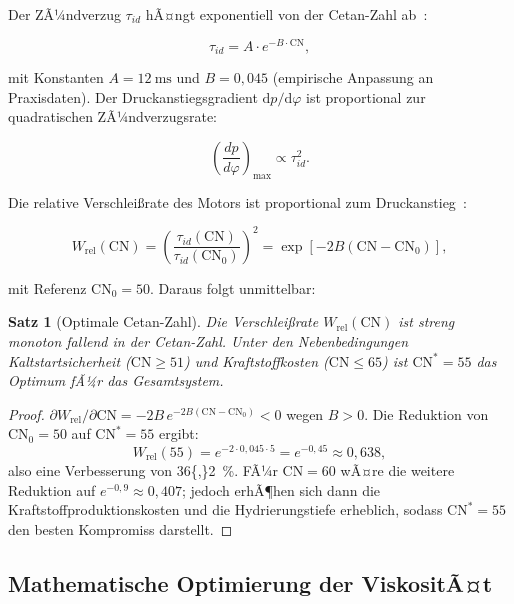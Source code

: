 ﻿\documentclass[12pt,a4paper]{article}
\newtheorem{theorem}{Satz}[section]
\newcommand{\CN}{\ensuremath{\mathrm{CN}}}
\begin{document}
Der ZÃ¼ndverzug $\tau_{id}$ hÃ¤ngt exponentiell von der Cetan-Zahl ab~\cite{heywood1988}:

\begin{equation}
  \tau_{id} = A \cdot e^{-B \cdot \CN},
  \label{eq:zuendverzug}
\end{equation}

mit Konstanten $A = \SI{12}{\ms}$ und $B = 0{,}045$ (empirische Anpassung
an Praxisdaten). Der Druckanstiegsgradient $\mathrm{d}p/\mathrm{d}\varphi$
ist proportional zur quadratischen ZÃ¼ndverzugsrate:

\begin{equation}
  \left(\frac{dp}{d\varphi}\right)_{\max} \propto \tau_{id}^2.
  \label{eq:druckanstieg}
\end{equation}

Die relative Verschlei\ss{}rate des Motors ist proportional zum
Druckanstieg~\cite{stanglmaier1999}:

\begin{equation}
  W_{\mathrm{rel}}(\CN) = \left(\frac{\tau_{id}(\CN)}{\tau_{id}(\CN_0)}\right)^2
  = \exp\!\left[-2B(\CN - \CN_0)\right],
  \label{eq:verschleiss_CN}
\end{equation}

mit Referenz $\CN_0 = 50$. Daraus folgt unmittelbar:

\begin{theorem}[Optimale Cetan-Zahl]
\label{thm:cetan}
Die Verschlei\ss{}rate $W_{\mathrm{rel}}(\CN)$ ist streng monoton fallend
in der Cetan-Zahl. Unter den Nebenbedingungen Kaltstartsicherheit
($\CN \geq 51$) und Kraftstoffkosten ($\CN \leq 65$) ist
$\CN^* = 55$ das Optimum fÃ¼r das Gesamtsystem.
\end{theorem}

\begin{proof}
$\partial W_{\mathrm{rel}} / \partial \CN = -2B \, e^{-2B(\CN-\CN_0)} < 0$
wegen $B > 0$. Die Reduktion von $\CN_0 = 50$ auf $\CN^* = 55$ ergibt:
\begin{equation}
  W_{\mathrm{rel}}(55) = e^{-2 \cdot 0{,}045 \cdot 5} = e^{-0{,}45} \approx 0{,}638,
\end{equation}
also eine Verbesserung von \SI{36{,}2}{\percent}. FÃ¼r $\CN = 60$ wÃ¤re
die weitere Reduktion auf $e^{-0{,}9} \approx 0{,}407$; jedoch erhÃ¶hen
sich dann die Kraftstoffproduktionskosten und die Hydrierungstiefe erheblich,
sodass $\CN^* = 55$ den besten Kompromiss darstellt.
\end{proof}

\subsection{Mathematische Optimierung der ViskositÃ¤t}
\label{sec:kraftstoff_viskositaet}
\end{document}
